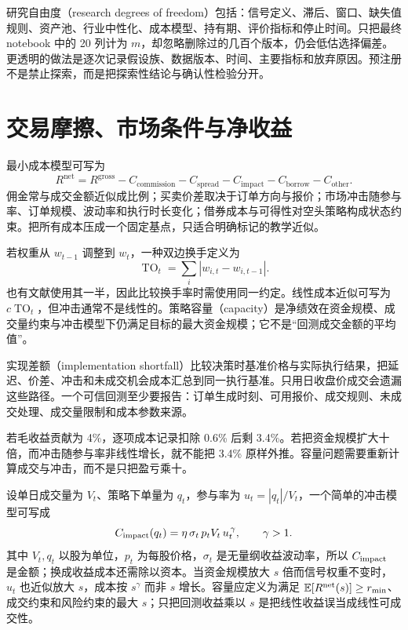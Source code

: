 
研究自由度（research degrees of freedom）包括：信号定义、滞后、窗口、缺失值规则、资产池、行业中性化、成本模型、持有期、评价指标和停止时间。只把最终 notebook 中的 20 列计为 $m$，却忽略删除过的几百个版本，仍会低估选择偏差。更透明的做法是逐次记录假设族、数据版本、时间、主要指标和放弃原因。预注册不是禁止探索，而是把探索性结论与确认性检验分开。

\section{交易摩擦、市场条件与净收益}

最小成本模型可写为
\[
  R^{\mathrm{net}}
  =R^{\mathrm{gross}}
  -C_{\mathrm{commission}}
  -C_{\mathrm{spread}}
  -C_{\mathrm{impact}}
  -C_{\mathrm{borrow}}
  -C_{\mathrm{other}}.
\]
佣金常与成交金额近似成比例；买卖价差取决于订单方向与报价；市场冲击随参与率、订单规模、波动率和执行时长变化；借券成本与可得性对空头策略构成状态约束。把所有成本压成一个固定基点，只适合明确标记的教学近似。


若权重从 $w_{t-1}$ 调整到 $w_t$，一种双边换手定义为
\[
  \operatorname{TO}_t=\sum_i |w_{i,t}-w_{i,t-1}|.
\]
也有文献使用其一半，因此比较换手率时需使用同一约定。线性成本近似可写为 $c\operatorname{TO}_t$，但冲击通常不是线性的。策略容量（capacity）是净绩效在资金规模、成交量约束与冲击模型下仍满足目标的最大资金规模；它不是“回测成交金额的平均值”。

实现差额（implementation shortfall）比较决策时基准价格与实际执行结果，把延迟、价差、冲击和未成交机会成本汇总到同一执行基准。只用日收盘价成交会遗漏这些路径。一个可信回测至少要报告：订单生成时刻、可用报价、成交规则、未成交处理、成交量限制和成本参数来源。

\begin{example}
若毛收益贡献为 4\%，逐项成本记录扣除 0.6\% 后剩 3.4\%。若把资金规模扩大十倍，而冲击随参与率非线性增长，就不能把 3.4\% 原样外推。容量问题需要重新计算成交与冲击，而不是只把盈亏乘十。
\end{example}


设单日成交量为 $V_t$、策略下单量为 $q_t$，参与率为
$u_t=|q_t|/V_t$，一个简单的冲击模型可写成
\[
 C_{\rm impact}(q_t)
 =\eta\,\sigma_t\,p_tV_t\,u_t^{\,\gamma},
 \qquad \gamma>1.
\]
其中 $V_t,q_t$ 以股为单位，$p_t$ 为每股价格，$\sigma_t$ 是无量纲收益波动率，所以 $C_{\rm impact}$ 是金额；换成收益成本还需除以资本。当资金规模放大 $s$ 倍而信号权重不变时，$u_t$ 也近似放大 $s$，成本按 $s^\gamma$ 而非 $s$ 增长。容量应定义为满足
$\mathbb E[R^{\rm net}(s)]\ge r_{\min}$、成交约束和风险约束的最大 $s$；只把回测收益乘以 $s$ 是把线性收益误当成线性可成交性。

